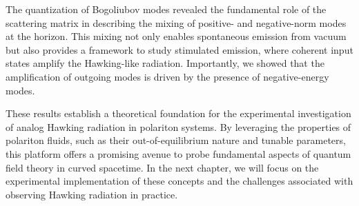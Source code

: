 The quantization of Bogoliubov modes revealed the fundamental role of the scattering matrix in describing the mixing of positive- and negative-norm modes at the horizon. This mixing not only enables spontaneous emission from vacuum but also provides a framework to study stimulated emission, where coherent input states amplify the Hawking-like radiation. Importantly, we showed that the amplification of outgoing modes is driven by the presence of negative-energy modes.

These results establish a theoretical foundation for the experimental investigation of analog Hawking radiation in polariton systems. By leveraging the properties of polariton fluids, such as their out-of-equilibrium nature and tunable parameters, this platform offers a promising avenue to probe fundamental aspects of quantum field theory in curved spacetime. In the next chapter, we will focus on the experimental implementation of these concepts and the challenges associated with observing Hawking radiation in practice.
